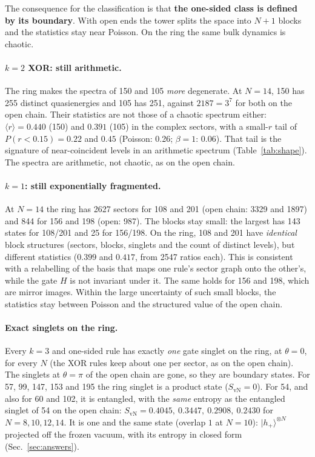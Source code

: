 The consequence for the classification is that \textbf{the one-sided class is defined by its boundary}. With open ends
the tower splits the space into $N+1$ blocks and the statistics stay near Poisson. On the ring the same bulk dynamics is
chaotic.

\paragraph{$k=2$ XOR: still arithmetic.} The ring makes the spectra of 150 and 105 \emph{more} degenerate. At $N=14$,
150 has 255 distinct quasienergies and 105 has 251, against $2187=3^7$ for both on the open chain. Their statistics
are not those of a chaotic spectrum either: $\langle r\rangle=0.440$ (150) and $0.391$ (105) in the complex sectors,
with a small-$r$ tail of $P(r<0.15)=0.22$ and $0.45$ (Poisson: 0.26; $\beta=1$: 0.06). That tail is the signature of
near-coincident levels in an arithmetic spectrum (Table~\ref{tab:shape}). The spectra are arithmetic, not chaotic, as on
the open chain.

\paragraph{$k=1$: still exponentially fragmented.} At $N=14$ the ring has 2627 sectors for 108 and 201 (open chain:
3329 and 1897) and 844 for 156 and 198 (open: 987). The blocks stay small: the largest has 143 states for 108/201 and 25
for 156/198. On the ring, 108 and 201 have \emph{identical} block structures (sectors, blocks, singlets and the count
of distinct levels), but different statistics ($0.399$ and $0.417$, from 2547 ratios each). This is consistent with a
relabelling of the basis that maps one rule's sector graph onto the other's, while the gate $H$ is not invariant under
it. The same holds for 156 and 198, which are mirror images. Within the large uncertainty of such small blocks, the
statistics stay between Poisson and the structured value of the open chain.

\paragraph{Exact singlets on the ring.} Every $k=3$ and one-sided rule has exactly \emph{one} gate singlet on the ring, at
$\theta=0$, for every $N$ (the XOR rules keep about one per sector, as on the open chain). The singlets at $\theta=\pi$ of the open chain are gone, so they are boundary states. For
57, 99, 147, 153 and 195 the ring singlet is a product state ($S_\mathrm{vN}=0$). For 54, and also for 60 and 102, it is
entangled, with the \emph{same} entropy as the entangled singlet of 54 on the open chain:
$S_\mathrm{vN}=0.4045,\ 0.3447,\ 0.2908,\ 0.2430$ for $N=8,10,12,14$. It is one and the same state (overlap $1$ at $N=10$): $|h_+\rangle^{\otimes N}$ projected off the frozen vacuum, with
its entropy in closed form (Sec.~\ref{sec:answers}).

